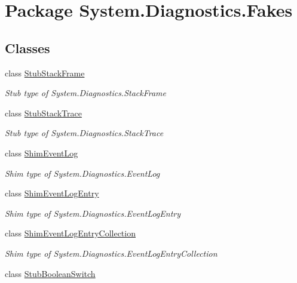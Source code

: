 \hypertarget{namespace_system_1_1_diagnostics_1_1_fakes}{\section{Package System.\-Diagnostics.\-Fakes}
\label{namespace_system_1_1_diagnostics_1_1_fakes}
}
\subsection*{Classes}
\begin{DoxyCompactItemize}
\item 
class \hyperlink{class_system_1_1_diagnostics_1_1_fakes_1_1_stub_stack_frame}{Stub\-Stack\-Frame}
\begin{DoxyCompactList}\small\item\em Stub type of System.\-Diagnostics.\-Stack\-Frame\end{DoxyCompactList}\item 
class \hyperlink{class_system_1_1_diagnostics_1_1_fakes_1_1_stub_stack_trace}{Stub\-Stack\-Trace}
\begin{DoxyCompactList}\small\item\em Stub type of System.\-Diagnostics.\-Stack\-Trace\end{DoxyCompactList}\item 
class \hyperlink{class_system_1_1_diagnostics_1_1_fakes_1_1_shim_event_log}{Shim\-Event\-Log}
\begin{DoxyCompactList}\small\item\em Shim type of System.\-Diagnostics.\-Event\-Log\end{DoxyCompactList}\item 
class \hyperlink{class_system_1_1_diagnostics_1_1_fakes_1_1_shim_event_log_entry}{Shim\-Event\-Log\-Entry}
\begin{DoxyCompactList}\small\item\em Shim type of System.\-Diagnostics.\-Event\-Log\-Entry\end{DoxyCompactList}\item 
class \hyperlink{class_system_1_1_diagnostics_1_1_fakes_1_1_shim_event_log_entry_collection}{Shim\-Event\-Log\-Entry\-Collection}
\begin{DoxyCompactList}\small\item\em Shim type of System.\-Diagnostics.\-Event\-Log\-Entry\-Collection\end{DoxyCompactList}\item 
class \hyperlink{class_system_1_1_diagnostics_1_1_fakes_1_1_stub_boolean_switch}{Stub\-Boolean\-Switch}

\end{DoxyCompactItemize}
